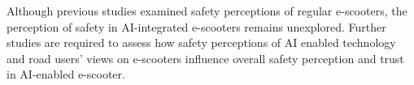 Although previous studies examined safety perceptions of regular e-scooters, the perception of safety in AI-integrated e-scooters remains unexplored. Further studies are required to assess how safety perceptions of AI enabled technology and road users' views on e-scooters influence overall safety perception and trust in AI-enabled e-scooter. 


